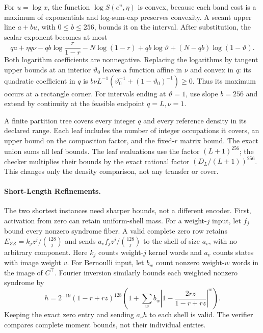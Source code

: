 For $u=\log x$, the function $\log S(e^u,\eta)$ is convex, because each band
cost is a maximum of exponentials and log-sum-exp preserves convexity.
A secant upper line $a+bu$, with $0\le b\le256$, bounds it on the interval.
After substitution, the scalar exponent becomes at most
\[
 qa+\eta q\nu-qb\log\frac r{1-r}-N\log(1-r)
       +qb\log\vartheta+(N-qb)\log(1-\vartheta).
\]
Both logarithm coefficients are nonnegative.
Replacing the logarithms by tangent upper bounds at an interior
$\vartheta_0$ leaves a function affine in $\nu$ and convex in $q$:
its quadratic coefficient in $q$ is
$b\nu L^{-1}(\vartheta_0^{-1}+(1-\vartheta_0)^{-1})\ge0$.
Thus its maximum occurs at a rectangle corner.
For intervals ending at $\vartheta=1$, use slope $b=256$ and extend by
continuity at the feasible endpoint $q=L,\nu=1$.

A finite partition tree covers every integer $q$ and every reference density
in its declared range. Each leaf includes the number of integer occupations
it covers, an upper bound on the composition factor, and the fixed-$r$
matrix bound. The exact union sums all leaf bounds.
The leaf evaluations use the factor $(L+1)^{256}$; the checker multiplies
their bounds by the exact rational factor $(D_L/(L+1))^{256}$.
This changes only the density comparison, not any transfer or cover.

\paragraph{Short-Length Refinements.}
The two shortest instances need sharper bounds, not a different encoder.
First, activation from zero can retain uniform-shell mass. For a
weight-$j$ input, let $f_j$ bound every nonzero syndrome fiber. A valid
complete zero row retains $E_{ZZ}=k_jz^j/\binom{128}{j}$ and sends
$a_vf_jz^j/\binom{128}{j}$ to the shell of size $a_v$, with no arbitrary
component. Here $k_j$ counts weight-$j$ kernel words and $a_v$ counts
states with image weight $v$. For Bernoulli input, let $b_w$ count
nonzero weight-$w$ words in the image of $C^\top$.
Fourier inversion similarly bounds each
weighted nonzero syndrome by
\[
 h=2^{-19}(1-r+rz)^{128}
 \left(1+\sum_w b_w\left|1-\frac{2rz}{1-r+rz}\right|^w\right).
\]
Keeping the exact zero entry and sending $a_vh$ to each shell is valid.
The verifier compares complete moment bounds, not their individual entries.

